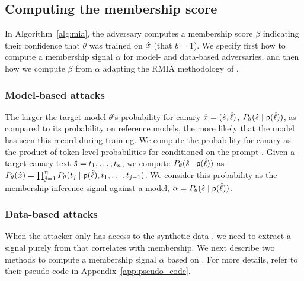 \subsection{Computing the membership score}
\label{sec:membership_method}

In Algorithm~\ref{alg:mia}, the adversary computes a membership score $\beta$ indicating their confidence that $\theta$ was trained on ${\hat{x}}$ (\ie that $b = 1$). 
%
We specify first how to compute a membership signal $\alpha$ for model- and data-based adversaries, and then how we compute $\beta$ from $\alpha$ adapting the RMIA methodology of \citet{zarifzadeh2024low}. 

\subsubsection{Model-based attacks}
\label{subsec:model_score}

The larger the target model $\theta$'s probability for canary ${\hat{x}} = ({\hat{s}}, {\hat{\ell}})$, $P_{\theta}({\hat{s}} \mid {\ensuremath{\textsf{p}({\hat{\ell}})}})$, as compared to its probability on reference models, the more likely that the model has seen this record during training. 
%
We compute the probability for canary  as the product of token-level probabilities for  conditioned on the prompt \prompt{\canary{\ell}}. 
%
Given a target canary text ${\hat{s}} = t_1,\ldots,t_n$, we compute
$P_{\theta}({\hat{s}} \mid {\ensuremath{\textsf{p}({\hat{\ell}})}})$ as $P_{\theta}({\hat{x}}) = \prod_{j=1}^n P_{\theta}(t_j \mid {\ensuremath{\textsf{p}({\hat{\ell}})}}, t_1, \ldots, t_{j-1})$. 
%
We consider this probability as the membership inference signal against a model, \ie $\alpha = P_{\theta}({\hat{s}} \mid {\ensuremath{\textsf{p}({\hat{\ell}})}})$.


\subsubsection{Data-based attacks}
\label{subsec:data_score}

When the attacker only has access to the synthetic data , we need to extract a signal purely from  that correlates with membership. 
%
We next describe two methods to compute a membership signal $\alpha$ based on . For more details, refer to their pseudo-code in Appendix~\ref{app:pseudo_code}. 


